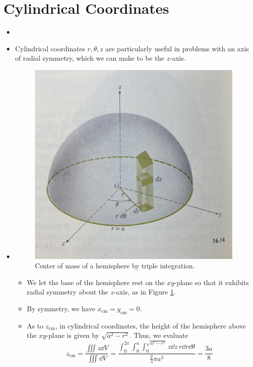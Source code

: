 \documentclass[../main.tex]{subfiles}
\begin{document}
\section{Cylindrical Coordinates}
\begin{itemize}
    \item {}
    \item Cylindrical coordinates $r,\theta,z$ are particularly useful in problems with an axis of radial symmetry, which we can make to be the $z$-axis.
    \item {}
    \begin{figure}[h!]
        \centering
        \includegraphics[width=0.4\linewidth]{ExtFiles/hemisphereCOM.jpg}
        \caption{Center of mass of a hemisphere by triple integration.}
        \label{fig:hemisphereCOM}
    \end{figure}
    \begin{itemize}
        \item We let the base of the hemisphere rest on the $xy$-plane so that it exhibits radial symmetry about the $z$-axis, as in Figure \ref{fig:hemisphereCOM}.
        \item By symmetry, we have $x_\text{cm}=y_\text{cm}=0$.
        \item As to $z_\text{cm}$, in cylindrical coordinates, the height of the hemisphere above the $xy$-plane is given by $\sqrt{a^2-r^2}$. Thus, we evaluate
        \begin{equation*}
            z_\text{cm} = \frac{\iiint z\dd{V}}{\iiint\dd{V}}
            = \frac{\int_0^{2\pi}\int_0^a\int_0^{\sqrt{a^2-r^2}}z\dd{z}\, r\dd{r}\dd{\theta}}{\frac{2}{3}\pi a^3}
            = \frac{3a}{8}
        \end{equation*}
    \end{itemize}
\end{itemize}
\end{document}
